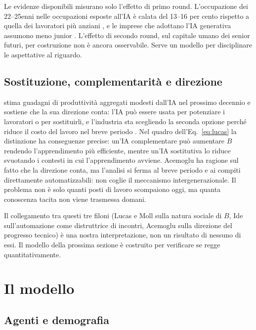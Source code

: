 \documentclass[preprint,12pt,authoryear]{elsarticle}
\begin{document}
Le evidenze disponibili misurano solo l'effetto di primo round. L'occupazione dei 22--25enni nelle occupazioni esposte all'IA è calata del 13--16 per cento rispetto a quella dei lavoratori più anziani \citep{Brynjolfsson2025}, e le imprese che adottano l'IA generativa assumono meno junior \citep{HosseiniLichtinger2025}. L'effetto di secondo round, sul capitale umano dei senior futuri, per costruzione non è ancora osservabile. Serve un modello per disciplinare le aspettative al riguardo.

\subsection{Sostituzione, complementarità e direzione}

\citet{Acemoglu2024} stima guadagni di produttività aggregati modesti dall'IA nel prossimo decennio e sostiene che la sua direzione conta: l'IA può essere usata per potenziare i lavoratori o per sostituirli, e l'industria sta scegliendo la seconda opzione perché riduce il costo del lavoro nel breve periodo \citep[si veda anche][]{AcemogluRestrepo2019}. Nel quadro dell'Eq.~\eqref{eq:lucas} la distinzione ha conseguenze precise: un'IA complementare può aumentare $B$ rendendo l'apprendimento più efficiente, mentre un'IA sostitutiva lo riduce svuotando i contesti in cui l'apprendimento avviene. Acemoglu ha ragione sul fatto che la direzione conta, ma l'analisi si ferma al breve periodo e ai compiti direttamente automatizzabili: non coglie il meccanismo intergenerazionale. Il problema non è solo quanti posti di lavoro scompaiono oggi, ma quanta conoscenza tacita non viene trasmessa domani.

Il collegamento tra questi tre filoni (Lucas e Moll sulla natura sociale di $B$, Ide sull'automazione come distruttrice di incontri, Acemoglu sulla direzione del progresso tecnico) è una nostra interpretazione, non un risultato di nessuno di essi. Il modello della prossima sezione è costruito per verificare se regge quantitativamente.

\section{Il modello}\label{sec:model}

\subsection{Agenti e demografia}
\end{document}
